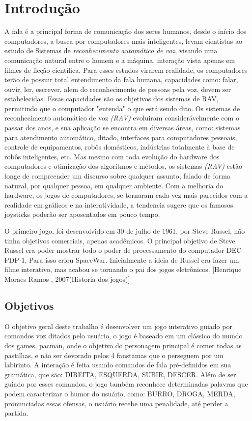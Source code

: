 \chapter{Introdução}

A fala é a principal forma de comunicação dos seres humanos, desde o início dos computadores, a busca por computadores mais inteligentes, levam cientistas ao estudo de Sistemas de \textit {reconhecimento automático de voz}, visando uma comunicação natural entre o homem e a máquina, interação vista apenas em filmes de ficção científica. \cite{RavPtBr}
Para esses estudos virarem realidade, os computadores terão de possuir total entendimento da fala humana, capacidades como: falar, ouvir, ler, escrever, alem do reconhecimento de pessoas pela voz, devem ser estabelecidas. Essas capacidades são os objetivos dos sistemas de RAV, permitindo que o computador "entenda" o que está sendo dito.\cite{RvPatrick}
Os sistemas de reconhecimento automático de voz \textit{(RAV)} evoluiram considerávelmente com o passar dos anos, e 
sua aplicação se encontra em diversas áreas, como: sistemas para atendimento automático, ditado, interfaces para computadores pessoais, controle de equipamentos, robôs domésticos, indústrias totalmente à base de robôs inteligentes, etc. \cite{RavPtBr} Mas mesmo com toda evolução do hardware dos computadores e otimização dos algoritmos e métodos, os sistemas \textit{(RAV)} estão longe de compreender um discurso sobre qualquer assunto, falado de forma natural, por qualquer pessoa, em qualquer ambiente.\cite{RavIsoladas} 
Com a melhoria do hardware, os jogos de computadores, se tornaram cada vez mais parecidos com a realidade em gráficos e na interatividade, a tendencia sugere que os famosos joysticks poderão ser aposentados em pouco tempo.

	O primeiro jogo, foi desenvolvido em 30 de julho de 1961, por Steve Russel, não tinha 
objetivos comerciais, apenas acadêmicos. O principal objetivo de Steve Russel era poder 
mostrar todo o poder de processamento do computador DEC PDP-1, Para isso criou 
SpaceWar. Inicialmente a ideia de Russel era fazer um filme interativo, mas acabou se 
tornando o pai dos jogos eletrônicos. [Henrique Moraes Ramos , 2007(Historia dos jogos)]

\section{Objetivos}
O objetivo geral deste trabalho é desenvolver um jogo interativo guiado por comandos voz ditados pelo usuário, o jogo é baseado em um clássico do mundo dos games, pacman, onde o objetivo do personagem principal é comer todas as pastilhas, e não ser devorado pelos 4 fanstamas que o perseguem por um labirinto. A interação é feita usando comandos de fala pré-definidos em sua gramática, que são: DIREITA, ESQUERDA, SUBIR, DESCER. Além de ser guiado por esses comandos, o jogo também reconhece determinadas palavras que podem caracterizar o humor do usuário, como: BURRO, DROGA, MERDA, pronunciadas essas ofensas, o usuário recebe uma penalidade, até perder a partida. 

